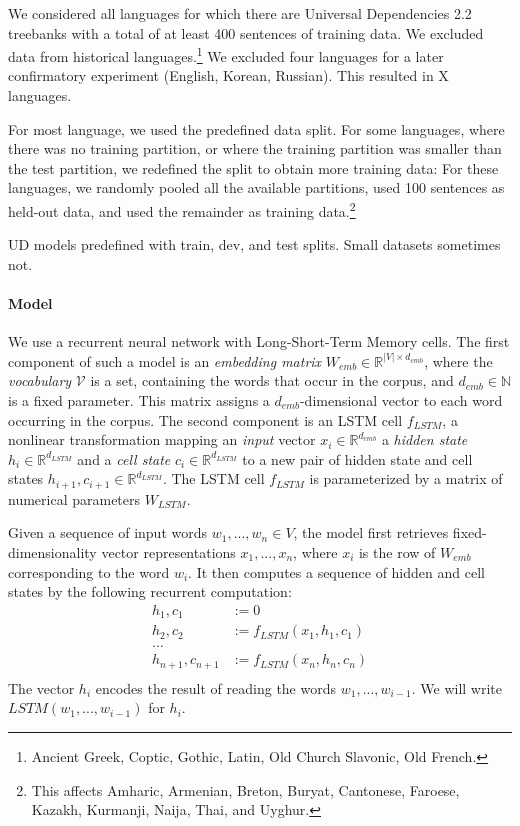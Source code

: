 \documentclass[11pt,letterpaper]{article}
\begin{document}
We considered all languages for which there are Universal Dependencies 2.2 treebanks with a total of at least 400 sentences of training data.
We excluded data from historical languages.\footnote{Ancient Greek, Coptic, Gothic, Latin, Old Church Slavonic, Old French.}
We excluded four languages for a later confirmatory experiment (English, Korean, Russian). %
This resulted in X languages.

For most language, we used the predefined data split.
For some languages, where there was no training partition, or where the training partition was smaller than the test partition, we redefined the split to obtain more training data:
For these languages, we randomly pooled all the available partitions, used 100 sentences as held-out data, and used the remainder as training data.\footnote{This affects Amharic, Armenian, Breton, Buryat, Cantonese, Faroese, Kazakh, Kurmanji, Naija, Thai, and Uyghur.}




UD models predefined with train, dev, and test splits.
Small datasets sometimes not.

\paragraph{Model}
We use a recurrent neural network with Long-Short-Term Memory cells.
%
The first component of such a model is an \emph{embedding matrix} $W_{emb} \in \mathbb{R}^{|V| \times d_{emb}}$, where the \emph{vocabulary} $\mathcal{V}$ is a set, containing the words that occur in the corpus, and $d_{emb} \in \mathbb{N}$ is a fixed parameter.
This matrix assigns a $d_{emb}$-dimensional vector to each word occurring in the corpus.
The second component is an LSTM cell $f_{LSTM}$, a nonlinear transformation mapping an \emph{input} vector $x_{i} \in \mathbb{R}^{d_{emb}}$ a \emph{hidden state} $h_i \in \mathbb{R}^{d_{LSTM}}$ and a \emph{cell state} $c_i \in \mathbb{R}^{d_{LSTM}}$ to a new pair of hidden state and cell states $h_{i+1}, c_{i+1} \in \mathbb{R}^{d_{LSTM}}$.
The LSTM cell $f_{LSTM}$ is parameterized by a matrix of numerical parameters $W_{LSTM}$.

Given a sequence of input words $w_1, ..., w_n \in V$, the model first retrieves fixed-dimensionality vector representations $x_1, ..., x_n$, where $x_i$ is the row of $W_{emb}$ corresponding to the word $w_i$.
It then computes a sequence of hidden and cell states by the following recurrent computation:
\begin{align*}
	h_1, c_1 &:= 0 \\
	h_2, c_2 &:= f_{LSTM}(x_1, h_1, c_1) \\
	\dots \\
	h_{n+1}, c_{n+1} &:= f_{LSTM}(x_n, h_n, c_n) \\
\end{align*}
The vector $h_i$ encodes the result of reading the words $w_1, ..., w_{i-1}$.
We will write $LSTM(w_1, ..., w_{i-1})$ for $h_i$.
\end{document}
